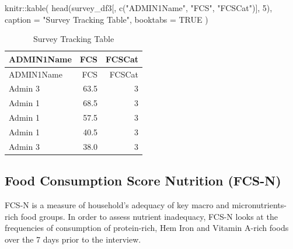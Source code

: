 \documentclass[
  letterpaper,
  DIV=11,
  numbers=noendperiod]{scrreprt}
\newenvironment{Shaded}{\begin{snugshade}}{\end{snugshade}}
\newcommand{\AttributeTok}[1]{\textcolor[rgb]{0.40,0.45,0.13}{#1}}
\newcommand{\ConstantTok}[1]{\textcolor[rgb]{0.56,0.35,0.01}{#1}}
\newcommand{\DecValTok}[1]{\textcolor[rgb]{0.68,0.00,0.00}{#1}}
\newcommand{\FunctionTok}[1]{\textcolor[rgb]{0.28,0.35,0.67}{#1}}
\newcommand{\NormalTok}[1]{\textcolor[rgb]{0.00,0.23,0.31}{#1}}
\newcommand{\SpecialCharTok}[1]{\textcolor[rgb]{0.37,0.37,0.37}{#1}}
\newcommand{\StringTok}[1]{\textcolor[rgb]{0.13,0.47,0.30}{#1}}
\begin{document}
\begin{Shaded}
\begin{Highlighting}[]
\NormalTok{knitr}\SpecialCharTok{::}\FunctionTok{kable}\NormalTok{(}
  \FunctionTok{head}\NormalTok{(survey\_df3[, }\FunctionTok{c}\NormalTok{(}\StringTok{"ADMIN1Name"}\NormalTok{, }\StringTok{"FCS"}\NormalTok{, }\StringTok{"FCSCat"}\NormalTok{)], }\DecValTok{5}\NormalTok{),}
  \AttributeTok{caption =} \StringTok{"Survey Tracking Table"}\NormalTok{,}
  \AttributeTok{booktabs =} \ConstantTok{TRUE}
\NormalTok{)}
\end{Highlighting}
\end{Shaded}

\begin{longtable}[]{@{}lrr@{}}
\caption{Survey Tracking Table}\tabularnewline
\toprule\noalign{}
ADMIN1Name & FCS & FCSCat \\
\midrule\noalign{}
\endfirsthead
\toprule\noalign{}
ADMIN1Name & FCS & FCSCat \\
\midrule\noalign{}
\endhead
\bottomrule\noalign{}
\endlastfoot
Admin 3 & 63.5 & 3 \\
Admin 1 & 68.5 & 3 \\
Admin 1 & 57.5 & 3 \\
Admin 1 & 40.5 & 3 \\
Admin 3 & 38.0 & 3 \\
\end{longtable}

\hypertarget{food-consumption-score-nutrition-fcs-n}{%
\subsection{Food Consumption Score Nutrition
(FCS-N)}\label{food-consumption-score-nutrition-fcs-n}}

FCS-N is a measure of household's adequacy of key macro and
micronutrients-rich food groups. In order to assess nutrient inadequacy,
FCS-N looks at the frequencies of consumption of protein-rich, Hem Iron
and Vitamin A-rich foods over the 7 days prior to the interview.
\end{document}

